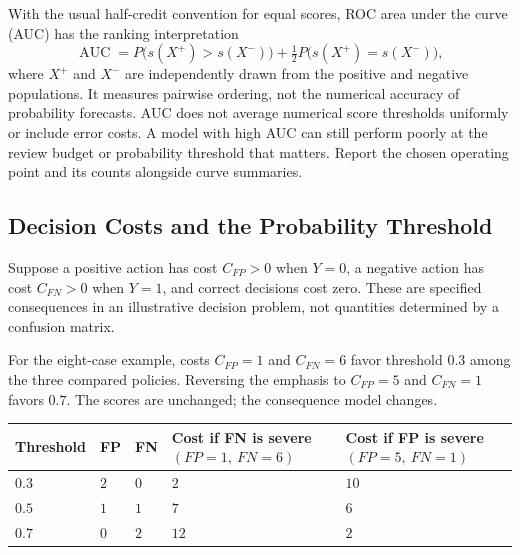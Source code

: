 With the usual half-credit convention for equal scores, ROC area under the curve (AUC) has the ranking interpretation \citep{cortes2004auc}
\[
\operatorname{AUC}=P\bigl(s(X^+)>s(X^-)\bigr)
+\tfrac12P\bigl(s(X^+)=s(X^-)\bigr),
\]
where $X^+$ and $X^-$ are independently drawn from the positive and negative populations. It measures pairwise ordering, not the numerical accuracy of probability forecasts. AUC does not average numerical score thresholds uniformly or include error costs. A model with high AUC can still perform poorly at the review budget or probability threshold that matters. Report the chosen operating point and its counts alongside curve summaries.

\subsection{Decision Costs and the Probability Threshold}

Suppose a positive action has cost $C_{FP}>0$ when $Y=0$, a negative action has cost $C_{FN}>0$ when $Y=1$, and correct decisions cost zero. These are specified consequences in an illustrative decision problem, not quantities determined by a confusion matrix.

For the eight-case example, costs $C_{FP}=1$ and $C_{FN}=6$ favor threshold $0.3$ among the three compared policies. Reversing the emphasis to $C_{FP}=5$ and $C_{FN}=1$ favors $0.7$. The scores are unchanged; the consequence model changes.

\par\addvspace{\intextsep}\noindent\begin{minipage}{\linewidth}
\centering
\small
\setlength{\tabcolsep}{4pt}
\begin{tabular}{@{}>{\raggedright\arraybackslash}p{1.73cm}>{\centering\arraybackslash}p{0.99cm}>{\centering\arraybackslash}p{0.99cm}>{\centering\arraybackslash}p{2.97cm}>{\centering\arraybackslash}p{2.97cm}@{}}
\toprule
Threshold & FP & FN & Cost if FN is severe $(FP=1,\ FN=6)$ & Cost if FP is severe $(FP=5,\ FN=1)$ \\
\midrule
$0.3$ & $2$ & $0$ & $2$ & $10$ \\
$0.5$ & $1$ & $1$ & $7$ & $6$ \\
$0.7$ & $0$ & $2$ & $12$ & $2$ \\
\bottomrule
\end{tabular}
\label{tab:threshold-cost-matrix}
\end{minipage}\par\addvspace{\intextsep}

